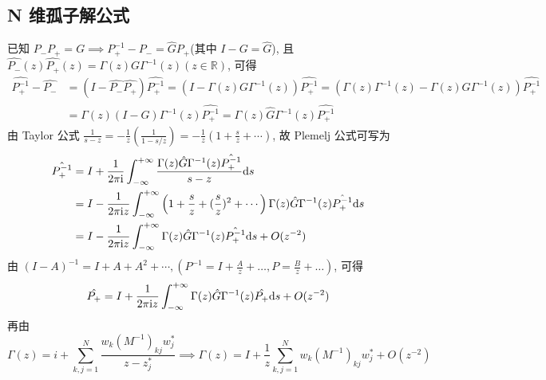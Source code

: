 \subsection{N 维孤子解公式}
已知 $ P_{-} P_{+} = G \implies P_{+}^{-1} - P_{-} = \hat{G}P_{+} $(其中 $ I - G = \hat{G} $), 且 $ \hat{P_{-}}(z) \hat{P_{+}}(z)  = \Gamma(z) G \Gamma^{-1}(z) (z \in \mathbb{R})$, 可得 
\begin{equation}
  \begin{aligned}
  \hat{P_{+}^{-1}}- \hat{P_{-}} &= (I - \hat{P_{-}} \hat{P_{+}}) \hat{P_{+}^{-1}} = \left(I - \Gamma (z) G \Gamma^{-1}(z) \right) \hat{P_{+}^{-1}} = (\Gamma(z)\Gamma^{-1}(z) - \Gamma(z) G \Gamma^{-1}(z)) \hat{P_{+}^{-1}} \\
    &= \Gamma(z) (I-G) \Gamma^{-1}(z)\hat{P_{+}^{-1}} = \Gamma(z) \hat{G} \Gamma^{-1}(z) \hat{P_{+}^{-1}} 
  \end{aligned}
\end{equation}
由 Taylor 公式 $ \frac{1}{s - z} = - \frac{1}{z} (\frac{1}{1- s/z}) = - \frac{1}{z} \left(1 + \frac{s}{z} + \cdots\right) $, 故 Plemelj 公式可写为
\begin{equation}
  \begin{aligned}
    \hat{P_{+}^{-1}} &= I + \frac{1}{2 \pi \mathrm{i} } \int_{-\infty}^{+\infty} \frac{\Gamma(z) \hat{G} \Gamma^{-1}(z) \hat{P_{+}^{-1}} }{s - z} \mathrm{d} s \\
    &= I - \frac{1}{2 \pi \mathrm{i} z} \int_{-\infty}^{+\infty} \left( 1 + \frac{s}{z} + (\frac{s}{z})^{2} + \cdots \right) \Gamma(z) \hat{G} \Gamma^{-1}(z) \hat{P_{+}^{-1}} \mathrm{d} s \\
    &= I - \frac{1}{2 \pi \mathrm{i} z} \int_{-\infty}^{+\infty}  \Gamma(z) \hat{G} \Gamma^{-1}(z) \hat{P_{+}^{-1}} \mathrm{d} s + O(z^{-2}) \\
  \end{aligned}
\end{equation}
由 $ (I - A)^{-1} = I + A + A^{2} + \cdots, (P^{-1} = I + \frac{A}{z} + \dots, P = \frac{B}{z} + \dots) $, 可得
\begin{equation}
  \hat{P_{+}} = I + \frac{1}{2 \pi \mathrm{i} z} \int_{-\infty}^{+\infty} \Gamma(z) \hat{G} \Gamma^{-1}(z) \hat{P_{+}} \mathrm{d} s + O(z^{-2})
\end{equation}
再由 
\begin{equation}
  \Gamma(z) = i + \sum_{k,j = 1}^{N} \frac{w_{k}(M^{-1})_{kj}w_{j}^{*}}{z-z_{j}^{*}} \implies \Gamma(z) = I + \frac{1}{z} \sum_{k,j = 1}^{N} w_{k}(M^{-1})_{kj}w_{j}^{*} + O(z^{-2}) \label{eq:Gamma-Asymptotic}
\end{equation}
